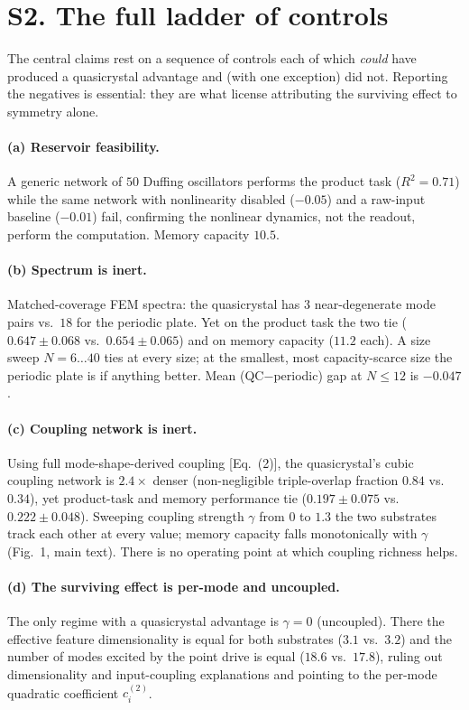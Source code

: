 \documentclass[aps,prapplied,reprint,amsmath,amssymb,floatfix]{revtex4-2}
\begin{document}
\section{S2. The full ladder of controls}

The central claims rest on a sequence of controls each of which \emph{could}
have produced a quasicrystal advantage and (with one exception) did not.
Reporting the negatives is essential: they are what license attributing the
surviving effect to symmetry alone.

\paragraph{(a) Reservoir feasibility.}
A generic network of $50$ Duffing oscillators performs the product task
($R^2=0.71$) while the same network with nonlinearity disabled ($-0.05$) and a
raw-input baseline ($-0.01$) fail, confirming the nonlinear dynamics, not the
readout, perform the computation. Memory capacity $10.5$.

\paragraph{(b) Spectrum is inert.}
Matched-coverage FEM spectra: the quasicrystal has $3$ near-degenerate mode
pairs vs.\ $18$ for the periodic plate. Yet on the product task the two tie
($0.647\pm0.068$ vs.\ $0.654\pm0.065$) and on memory capacity ($11.2$ each).
A size sweep $N=6\ldots40$ ties at every size; at the smallest, most
capacity-scarce size the periodic plate is if anything better. Mean
(QC$-$periodic) gap at $N\!\le\!12$ is $-0.047$.

\paragraph{(c) Coupling network is inert.}
Using full mode-shape-derived coupling [Eq.~(2)], the quasicrystal's cubic
coupling network is $2.4\times$ denser (non-negligible triple-overlap fraction
$0.84$ vs.\ $0.34$), yet product-task and memory performance tie
($0.197\pm0.075$ vs.\ $0.222\pm0.048$). Sweeping coupling strength $\gamma$
from $0$ to $1.3$ the two substrates track each other at every value; memory
capacity falls monotonically with $\gamma$ (Fig.~1, main text). There is no
operating point at which coupling richness helps.

\paragraph{(d) The surviving effect is per-mode and uncoupled.}
The only regime with a quasicrystal advantage is $\gamma=0$ (uncoupled). There
the effective feature dimensionality is equal for both substrates
($3.1$ vs.\ $3.2$) and the number of modes excited by the point drive is equal
($18.6$ vs.\ $17.8$), ruling out dimensionality and input-coupling explanations
and pointing to the per-mode quadratic coefficient $c^{(2)}_i$.
\end{document}
